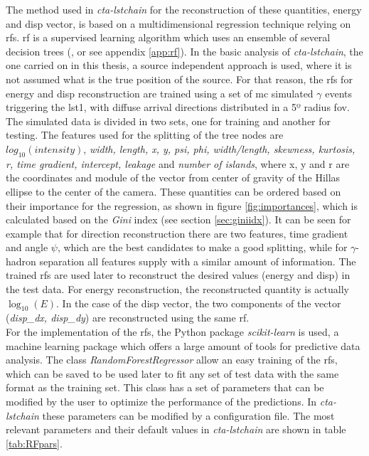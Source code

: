 \documentclass[main.tex]{subfiles}
\begin{document}
The method used in \textit{cta-lstchain} for the reconstruction of these quantities, energy and disp vector, is based on a multidimensional regression technique relying on \glspl{rf}. \gls{rf} is a supervised learning algorithm which uses an ensemble of several decision trees (\cite{breiman2001random}, or see appendix \ref{app:rf}).
In the basic analysis of \textit{cta-lstchain}, the one carried on in this thesis, a source independent approach is used, where it is not assumed what is the true position of the source. For that reason, the \glspl{rf} for energy and disp reconstruction are trained using a set of \gls{mc} simulated $\gamma$ events triggering the \gls{lst}1, with diffuse arrival directions distributed in a 5º radius \gls{fov}. The simulated data is divided in two sets, one for training and another for testing. The features used for the splitting of the tree nodes are $log_{10}(intensity)$, \textit{width, length, x, y, psi, phi, width/length, skewness, kurtosis, r, time gradient, intercept, leakage} and \textit{number of islands}, where x, y and r are the coordinates and module of the vector from center of gravity of the Hillas ellipse to the center of the camera. These quantities can be ordered based on their importance for the regression, as shown in figure \ref{fig:importances}, which is calculated based on the \textit{Gini} index (see section \ref{sec:giniidx}). It can be seen for example that for direction reconstruction there are two features, time gradient and angle $\psi$, which are the best candidates to make a good splitting, while for $\gamma$-hadron separation all features supply with a similar amount of information. 
The trained \glspl{rf} are used later to reconstruct the desired values (energy and disp) in the test data. For energy reconstruction, the reconstructed quantity is actually $\log_{10}(E)$. In the case of the disp vector, the two components of the vector (\textit{disp\_dx, disp\_dy}) are reconstructed using the same \gls{rf}.\\
For the implementation of the \glspl{rf}, the Python package \textit{scikit-learn} \cite{2011scikit-learn} is used, a machine learning package which offers a large amount of tools for predictive data analysis. The class \textit{RandomForestRegressor} allow an easy training of the \glspl{rf}, which can be saved to be used later to fit any set of test data with the same format as the training set. This class has a set of parameters that can be modified by the user to optimize the performance of the predictions. In \textit{cta-lstchain} these parameters can be modified by a configuration file. The most relevant parameters and their default values in \textit{cta-lstchain} are shown in table \ref{tab:RFpars}. 
\end{document}

